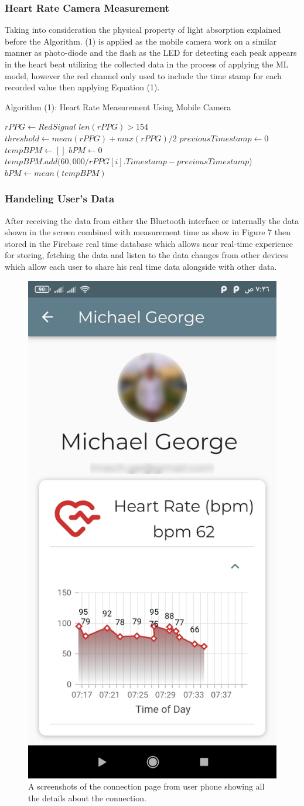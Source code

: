 \documentclass{bmcart}
\begin{document}
\subsubsection*{Heart Rate Camera Measurement}
Taking into consideration the physical property of light absorption explained
before the Algorithm. (1)  is applied as the mobile camera work on a similar
manner as photo-diode and the flash as the LED for detecting each peak appears
in the heart beat utilizing the collected data in the process of applying the ML
model, however the red channel only used to include the time stamp for each
recorded value then applying Equation (1).
\begin{algorithm}
{Algorithm (1): Heart Rate Measurement Using Mobile Camera}\label{alg:cap}
\begin{algorithmic}
\Require $rPPG \gets RedSignal$
\Ensure $len(rPPG) > 154$
\State $threshold \gets mean(rPPG) + max(rPPG) / 2$
\State $previousTimestamp \gets 0$
\State $tempBPM \gets []$
\State $bPM \gets 0$
\\
$tempBPM.add(60,000 / rPPG[i].Timestamp - previousTimestamp$)
\EndIf
\EndIf
\EndFor
\State $bPM \gets mean(tempBPM)$
\end{algorithmic}
\end{algorithm}
\FloatBarrier

\subsubsection*{Handeling User's Data}
After receiving the data from either the Bluetooth interface or internally the
data shown in the screen combined with measurement time as show in Figure 7 then
stored in the Firebase real time database which allows near real-time experience
for storing, fetching the data and listen to the data changes from other devices
which allow each user to share his real time data alongside with other data.
\begin{figure}[h!]
  \includegraphics[width=.3\linewidth]{jpg_images/connection_page.jpg}
  \caption{
      A screenshots of the connection page from user phone showing all the
      details about the connection.}
\end{figure}
\FloatBarrier
\end{document}
